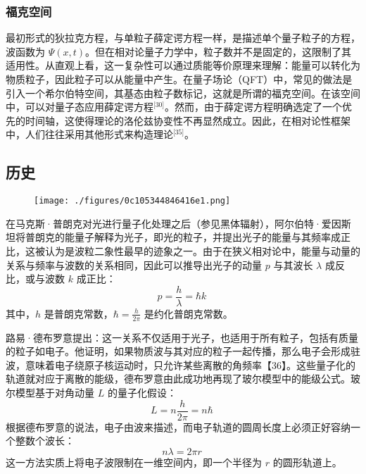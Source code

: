 \subsubsection{福克空间}
最初形式的狄拉克方程，与单粒子薛定谔方程一样，是描述单个量子粒子的方程，波函数为 $\Psi(x, t)$。但在相对论量子力学中，粒子数并不是固定的，这限制了其适用性。从直观上看，这一复杂性可以通过质能等价原理来理解：能量可以转化为物质粒子，因此粒子可以从能量中产生。在量子场论（QFT）中，常见的做法是引入一个希尔伯特空间，其基态由粒子数标记，这就是所谓的福克空间。在该空间中，可以对量子态应用薛定谔方程\(^\text{[30]}\)。然而，由于薛定谔方程明确选定了一个优先的时间轴，这使得理论的洛伦兹协变性不再显然成立。因此，在相对论性框架中，人们往往采用其他形式来构造理论\(^\text{[35]}\)。
\subsection{历史}
\begin{figure}[ht]
\centering
\texttt{[image: ./figures/0c105344846416e1.png]}
\caption{} \label{fig_XDEfc_6}
\end{figure}
在马克斯·普朗克对光进行量子化处理之后（参见黑体辐射），阿尔伯特·爱因斯坦将普朗克的能量子解释为光子，即光的粒子，并提出光子的能量与其频率成正比，这被认为是波粒二象性最早的迹象之一。由于在狭义相对论中，能量与动量的关系与频率与波数的关系相同，因此可以推导出光子的动量 $p$ 与其波长 $\lambda$ 成反比，或与波数 $k$ 成正比：
$$
p = \frac{h}{\lambda} = \hbar k~
$$
其中，$h$ 是普朗克常数，$\hbar = \frac{h}{2\pi}$ 是约化普朗克常数。

路易·德布罗意提出：这一关系不仅适用于光子，也适用于所有粒子，包括有质量的粒子如电子。他证明，如果物质波与其对应的粒子一起传播，那么电子会形成驻波，意味着电子绕原子核运动时，只允许某些离散的角频率【36】。这些量子化的轨道就对应于离散的能级，德布罗意由此成功地再现了玻尔模型中的能级公式。玻尔模型基于对角动量 $L$ 的量子化假设：
$$
L = n \frac{h}{2\pi} = n\hbar~
$$
根据德布罗意的说法，电子由波来描述，而电子轨道的圆周长度上必须正好容纳一个整数个波长：
$$
n\lambda = 2\pi r~
$$
这一方法实质上将电子波限制在一维空间内，即一个半径为 $r$ 的圆形轨道上。
